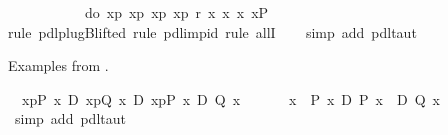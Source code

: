 \begin{isabellebody}
\ \ \ \ \ \ \ \ \ \ {\isacharbrackleft}{\isacharhash}\ do\ {\isacharbraceleft}x{}{\isasymleftarrow}p{}{\isacharsemicolon}\ x{}{\isasymleftarrow}p{}{\isacharsemicolon}\ x{}{\isasymleftarrow}p{}{\isacharsemicolon}\ x{}{\isasymleftarrow}p{}{\isacharsemicolon}\ r\ x{}\ x{}\ x{}\ x{}{\isacharbraceright}{\isacharbrackright}P{\isachardoublequote}\isanewline
\ \ \isamarkupfalse%
rule\ pdl{\isacharunderscore}plugB{\isacharunderscore}lifted{}{\isacharcomma}\ rule\ pdl{\isacharunderscore}imp{\isacharunderscore}id{\isacharcomma}\ rule\ allI{\isacharparenright}{\isacharplus}\isanewline
\ \ \isamarkupfalse%
\ {\isacharparenleft}simp\ add{\isacharcolon}\ pdl{\isacharunderscore}taut{\isacharparenright}\isanewline
\isanewline
\isamarkupfalse%
\isamarkupfalse%
\isamarkupfalse%
\isamarkupfalse%
\isamarkupfalse%
\isamarkupfalse%
\isamarkupfalse%
\isamarkupfalse%
\isamarkupfalse%
\isamarkupfalse%
\isamarkupfalse%
\isamarkupfalse%
\isamarkupfalse%
\isamarkupfalse%
\isamarkupfalse%
\isamarkupfalse%
\isamarkupfalse%
\isamarkupfalse%
\isamarkupfalse%
\isamarkupfalse%
\isamarkupfalse%
\isamarkupfalse%
\isamarkupfalse%
\isamarkupfalse%
\isamarkupfalse%
\isamarkupfalse%
\isamarkuptrue%
\isamarkupfalse%
\isamarkupfalse%
\isamarkupfalse%
\isamarkupfalse%
\isamarkupfalse%
\isamarkupfalse%
\isamarkupfalse%
%
\isamarkuptrue%
%
\begin{isamarkuptext}%
Examples from \cite[Theorem 6]{HarelKozen02}.
  \label{isa:harel-kozen}%
\end{isamarkuptext}%
\isamarkuptrue%
\ {\isachardoublequote}{\isasymturnstile}\ {\isasymlangle}x{\isasymleftarrow}p{\isasymrangle}{\isacharparenleft}P\ x{\isacharparenright}\ {\isasymor}\isactrlsub D\ {\isasymlangle}x{\isasymleftarrow}p{\isasymrangle}{\isacharparenleft}Q\ x{\isacharparenright}\ {\isasymlongrightarrow}\isactrlsub D\ {\isasymlangle}x{\isasymleftarrow}p{\isasymrangle}{\isacharparenleft}P\ x\ {\isasymor}\isactrlsub D\ Q\ x{\isacharparenright}{\isachardoublequote}\isanewline
\isamarkupfalse%
\ {\isacharminus}\isanewline
\ \ \isamarkupfalse%
\ {\isachardoublequote}\ {\isasymforall}x{\isachardot}\ {\isasymturnstile}\ P\ x\ {\isasymlongrightarrow}\isactrlsub D\ P\ x\ \ {\isasymor}\isactrlsub D\ Q\ x{\isachardoublequote}\ \isamarkupfalse%
\ {\isacharparenleft}simp\ add{\isacharcolon}\ pdl{\isacharunderscore}taut{\isacharparenright}\ \isanewline

\end{isabellebody}
